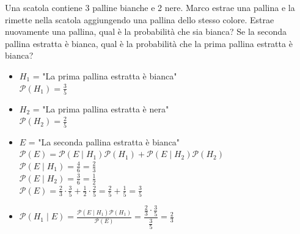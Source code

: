 \documentclass[12pt]{report}
\newcounter{exercise}
\begin{document}
	\begin{exercise}{}{}
		\begin{assignment}{}{}
			Una scatola contiene 3 palline bianche e 2 nere. Marco estrae una pallina e la rimette nella scatola aggiungendo una pallina dello stesso colore. Estrae nuovamente una pallina, qual è la probabilità che sia bianca? Se la seconda pallina estratta è bianca, qual è la probabilità che la prima pallina estratta è bianca?
		\end{assignment}
		\begin{itemize}
			\item $H_1$ = "La prima pallina estratta è bianca" \\
			$\mathcal{P}(H_1) = \frac{3}{5}$
			\item $H_2$ = "La prima pallina estratta è nera" \\
			$\mathcal{P}(H_2) = \frac{2}{5}$
			\item $E$ = "La seconda pallina estratta è bianca" \\
			$\mathcal{P}(E) = \mathcal{P}(E \mid H_1)\mathcal{P}(H_1) + \mathcal{P}(E \mid H_2)\mathcal{P}(H_2)$ \\
			$\mathcal{P}(E \mid H_1) = \frac{4}{6} = \frac{2}{3}$ \\
			$\mathcal{P}(E \mid H_2) = \frac{3}{6} = \frac{1}{2}$ \\
			$\mathcal{P}(E) = \frac{2}{3} \cdot \frac{3}{5} + \frac{1}{2} \cdot \frac{2}{5} = \frac{2}{5} + \frac{1}{5} = \frac{3}{5}$
			\item $\mathcal{P}(H_1 \mid E) = \frac{\mathcal{P}(E \mid H_1)\mathcal{P}(H_1)}{\mathcal{P}(E)} = \dfrac{\frac{2}{3} \cdot \frac{3}{5}}{\frac{3}{5}} = \frac{2}{3}$
		\end{itemize}
	\end{exercise}
\end{document}

